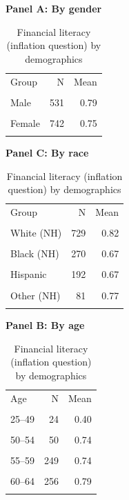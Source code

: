 \begin{table}[htbp]\centering\small
\caption{Financial literacy (inflation question) by demographics}
\label{tab:finlit_q2_demographics_panels}
\begin{minipage}[t]{0.48\textwidth}\centering
\textbf{Panel A: By gender}\\[0.3em]
\begin{tabular}{lrr}\toprule
Group & N & Mean \\\\ \midrule
Male & 531 & 0.79 \\\\
Female & 742 & 0.75 \\\\
\bottomrule\end{tabular}
\end{minipage}
\hfill
\begin{minipage}[t]{0.48\textwidth}\centering
\textbf{Panel C: By race}\\[0.3em]
\begin{tabular}{lrr}\toprule
Group & N & Mean \\\\ \midrule
White (NH) & 729 & 0.82 \\\\
Black (NH) & 270 & 0.67 \\\\
Hispanic & 192 & 0.67 \\\\
Other (NH) & 81 & 0.77 \\\\
\bottomrule\end{tabular}
\end{minipage}
\par\vspace{0.8em}
\begin{minipage}[t]{0.48\textwidth}\centering
\textbf{Panel B: By age}\\[0.3em]
\begin{tabular}{lrr}\toprule
Age & N & Mean \\\\ \midrule
25--49 & 24 & 0.40 \\\\
50--54 & 50 & 0.74 \\\\
55--59 & 249 & 0.74 \\\\
60--64 & 256 & 0.79 \\\\

\end{tabular}
\end{minipage}
\end{table}
